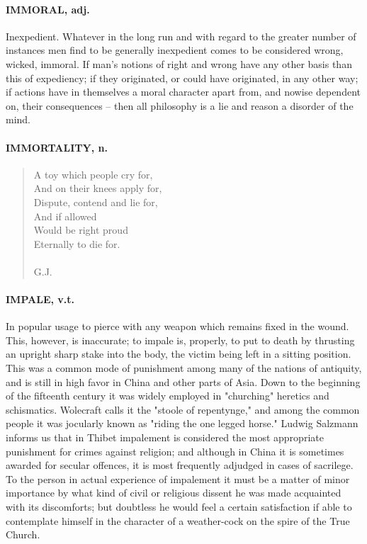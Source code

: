 \documentclass[11pt]{article}
\begin{document}
\paragraph{IMMORAL, adj.}  Inexpedient.  Whatever in the long run and with regard
to the greater number of instances men find to be generally
inexpedient comes to be considered wrong, wicked, immoral.  If man's
notions of right and wrong have any other basis than this of
expediency; if they originated, or could have originated, in any other
way; if actions have in themselves a moral character apart from, and
nowise dependent on, their consequences -- then all philosophy is a
lie and reason a disorder of the mind.

\paragraph{IMMORTALITY, n.}

\begin{quote}   A toy which people cry for, \\
  And on their knees apply for, \\
  Dispute, contend and lie for, \\
      And if allowed \\
      Would be right proud \\
  Eternally to die for. \\
 \\
G.J. \end{quote}


\paragraph{IMPALE, v.t.}  In popular usage to pierce with any weapon which remains
fixed in the wound.  This, however, is inaccurate; to impale is,
properly, to put to death by thrusting an upright sharp stake into the
body, the victim being left in a sitting position.  This was a common
mode of punishment among many of the nations of antiquity, and is
still in high favor in China and other parts of Asia.  Down to the
beginning of the fifteenth century it was widely employed in
"churching" heretics and schismatics.  Wolecraft calls it the "stoole
of repentynge," and among the common people it was jocularly known as
"riding the one legged horse."  Ludwig Salzmann informs us that in
Thibet impalement is considered the most appropriate punishment for
crimes against religion; and although in China it is sometimes awarded
for secular offences, it is most frequently adjudged in cases of
sacrilege.  To the person in actual experience of impalement it must
be a matter of minor importance by what kind of civil or religious
dissent he was made acquainted with its discomforts; but doubtless he
would feel a certain satisfaction if able to contemplate himself in
the character of a weather-cock on the spire of the True Church.
\end{document}
